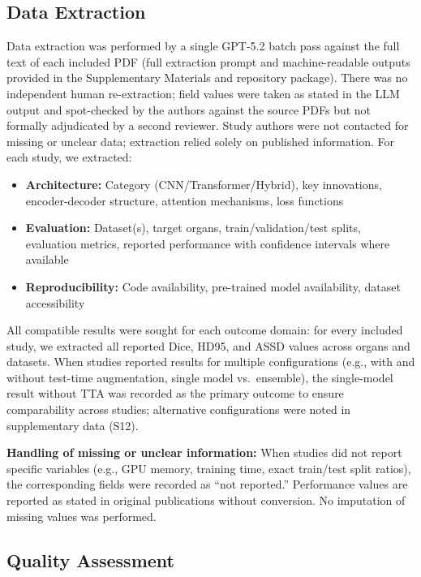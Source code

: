 \documentclass[conference]{IEEEtran}
\begin{document}
\subsection{Data Extraction}

Data extraction was performed by a single GPT-5.2 batch pass against the full text of each included PDF (full extraction prompt and machine-readable outputs provided in the Supplementary Materials and repository package). There was no independent human re-extraction; field values were taken as stated in the LLM output and spot-checked by the authors against the source PDFs but not formally adjudicated by a second reviewer. Study authors were not contacted for missing or unclear data; extraction relied solely on published information. For each study, we extracted:

\begin{itemize}
    \item \textbf{Architecture:} Category (CNN/Transformer/Hybrid), key innovations, encoder-decoder structure, attention mechanisms, loss functions
    \item \textbf{Evaluation:} Dataset(s), target organs, train/validation/test splits, evaluation metrics, reported performance with confidence intervals where available
    \item \textbf{Reproducibility:} Code availability, pre-trained model availability, dataset accessibility
\end{itemize}

All compatible results were sought for each outcome domain: for every included study, we extracted all reported Dice, HD95, and ASSD values across organs and datasets. When studies reported results for multiple configurations (e.g., with and without test-time augmentation, single model vs.\ ensemble), the single-model result without TTA was recorded as the primary outcome to ensure comparability across studies; alternative configurations were noted in supplementary data (S12).

\textbf{Handling of missing or unclear information:} When studies did not report specific variables (e.g., GPU memory, training time, exact train/test split ratios), the corresponding fields were recorded as ``not reported.'' Performance values are reported as stated in original publications without conversion. No imputation of missing values was performed.

\subsection{Quality Assessment}
\end{document}
